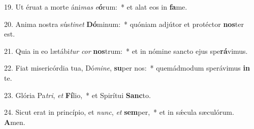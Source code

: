 19. Ut éruat a morte áni\textit{mas} \textit{e}\textbf{ó}rum:~*  et alat eos in \textbf{fa}me.\

20. Anima nostra sús\textit{ti}\textit{net} \textbf{Dó}minum:~*  quóniam adjútor et protéctor \textbf{nos}ter est.\

21. Quia in eo lætábi\textit{tur} \textit{cor} \textbf{nos}trum:~*  et in nómine sancto ejus spe\textbf{rá}vimus.\

22. Fiat misericórdia tua, Dó\textit{mi}\textit{ne}, \textbf{su}per nos:~*  quemádmodum sperávimus \textbf{in} te.\

23. Glória Pa\textit{tri}, \textit{et} \textbf{Fí}lio,~*  et Spirítui \textbf{Sanc}to.\

24. Sicut erat in princípio, et \textit{nunc}, \textit{et} \textbf{sem}per,~*  et in sǽcula sæculórum. \textbf{A}men.\

